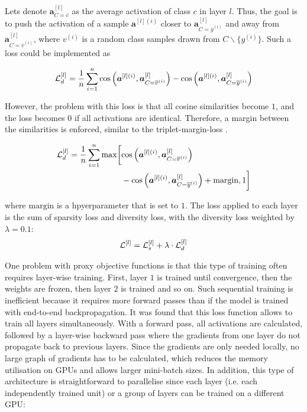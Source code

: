 Lets denote {\footnotesize $\boldsymbol{a}^{[l]}_{C=\overline{c}}$} as the average activation of class $c$ in layer $l$. Thus, the goal is to push the activation of a sample {\footnotesize $\boldsymbol{a}^{[l](i)}$} closer to {\footnotesize $\boldsymbol{a}^{[l]}_{C=\overline{y}^{(i)}}$} and away from {\footnotesize $\boldsymbol{a}^{[l]}_{C=\overline{v}^{(i)}}$}, where $v^{(i)}$ is a random class samples drawn from {\footnotesize $ C \backslash \{y^{(i)} \}$}. Such a loss could be implemented as

\begin{align}\eqlbl{vso_8}
		\mathcal{L}^{[l]}_{d}  = \frac{1}{n} \sum_{i=1}^{n} \text{cos} \left(\boldsymbol{a}^{[l](i)}, \boldsymbol{a}^{[l]}_{C=\overline{v}^{(i)}} \right) - \text{cos} \left(\boldsymbol{a}^{[l](i)}, \boldsymbol{a}^{[l]}_{C=\overline{y}^{(i)}} \right)
\end{align}

However, the problem with this loss is that all cosine similarities become $1$, and the loss becomes $0$ if all activations are identical.
Therefore, a margin between the similarities is enforced, similar to the triplet-margin-loss  .


\begin{align}\eqlbl{vso_9}
\begin{split}
		\mathcal{L}^{[l]}_{d} = \frac{1}{n} \sum_{i=1}^{n} \max \biggl[ & \text{cos} \left(\boldsymbol{a}^{[l](i)}, \boldsymbol{a}^{[l]}_{C=\overline{v}^{(i)}} \right) \\
		& - \text{cos} \left(\boldsymbol{a}^{[l](i)}, \boldsymbol{a}^{[l]}_{C=\overline{y}^{(i)}} \right) + \text{margin}, 1 \biggr]
\end{split}
\end{align}

where $\text{margin}$ is a hpyerparameter that is set to $1$.
The loss applied to each layer is the sum of sparsity loss and diversity loss, with the diversity loss weighted by $\lambda=0.1$:
\begin{align}\eqlbl{vso_10}
		\mathcal{L}^{[l]} =\mathcal{L}^{[l]}_{s} + \lambda \cdot \mathcal{L}^{[l]}_{d}
\end{align}


One problem with proxy objective functions is that this type of training often requires layer-wise training. First, layer $1$ is trained until convergence, then the weights are frozen, then layer $2$ is trained and so on.
Such sequential training is inefficient because it requires more forward passes than if the model is trained with end-to-end backpropagation.
It was found that this loss function allows to train all layers simultaneously. With a forward pass, all activations are calculated, followed by a layer-wise backward pass where the gradients from one layer do not propagate back to previous layers.
Since the gradients are only needed locally, no large graph of gradients has to be calculated, which reduces the memory utilisation on GPUs and allows larger mini-batch sizes. In addition, this type of architecture is straightforward to parallelise since each layer (i.e. each independently trained unit) or a group of layers can be trained on a different GPU:

